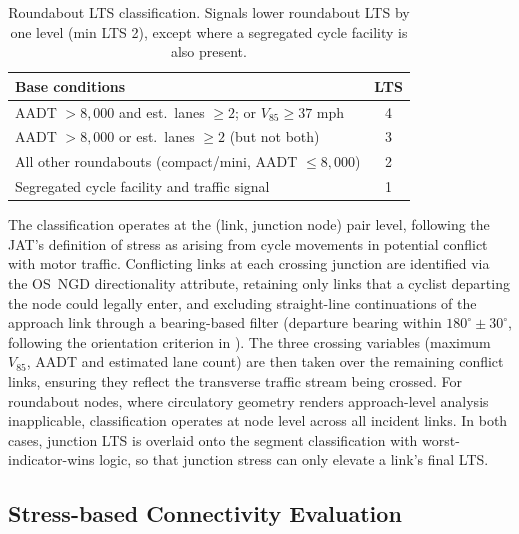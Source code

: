 \documentclass[final,5p,times,twocolumn,authoryear]{elsarticle}
\begin{document}
\begin{table}[!t]
\centering
\caption{Roundabout LTS classification. Signals lower roundabout LTS by one level (min LTS 2), except where a segregated cycle facility is also present.}
\label{tab:roundabout-lts}
\small
\begin{tabularx}{\linewidth}{Y c}
\toprule
Base conditions & LTS \\
\midrule
AADT $> 8{,}000$ and est.\ lanes $\geq 2$; or $V_{85} \geq 37$ mph & 4 \\
AADT $> 8{,}000$ or est.\ lanes $\geq 2$ (but not both) & 3 \\
All other roundabouts (compact/mini, AADT $\leq 8{,}000$) & 2 \\
Segregated cycle facility and traffic signal & 1 \\
\bottomrule
\end{tabularx}
\end{table}


\noindent The classification operates at the (link, junction node) pair level, following the JAT's definition of stress as arising from cycle movements in potential conflict with motor traffic. Conflicting links at each crossing junction are identified via the OS~NGD directionality attribute, retaining only links that a cyclist departing the node could legally enter, and excluding straight-line continuations of the approach link through a bearing-based filter (departure bearing within $180^\circ \pm 30^\circ$, following the orientation criterion in \citealp{mekuria2012a}). The three crossing variables (maximum $V_{85}$, AADT and estimated lane count) are then taken over the remaining conflict links, ensuring they reflect the transverse traffic stream being crossed. For roundabout nodes, where circulatory geometry renders approach-level analysis inapplicable, classification operates at node level across all incident links. In both cases, junction LTS is overlaid onto the segment classification with worst-indicator-wins logic, so that junction stress can only elevate a link's final LTS.

\subsection{Stress-based Connectivity Evaluation}
\label{sec:connectivity}
\end{document}
